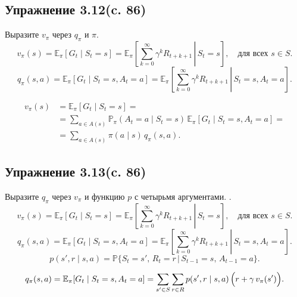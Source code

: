 \subsection{Упражнение 3.12(c. 86)}
Выразите $v_\pi$ через $q_\pi$ и $\pi$.
\[
    v_{\pi}(s)
    =
    \mathbb{E}_{\pi}\!\left[ G_t \mid S_t = s \right]
    =
    \mathbb{E}_{\pi}\!\left[ \left. \sum_{k=0}^{\infty} \gamma^k R_{t+k+1} \,\right|\, S_t = s \right],
    \quad \text{для всех } s \in S.
\]
\[
    q_{\pi}(s,a)
    =
    \mathbb{E}_{\pi}\!\left[ G_t \mid S_t = s, A_t = a \right]
    =
    \mathbb{E}_{\pi}\!\left[ \left. \sum_{k=0}^{\infty} \gamma^k R_{t+k+1}
    \,\right|\, S_t = s, A_t = a \right].
\]
\begin{solution}
    \begin{align*}
    v_\pi(s)
    &= \mathbb{E}_\pi\!\left[ G_t \mid S_t = s \right] =\\
    &= \sum_{a\in A(s)} \mathbb{P}_\pi(A_t=a \mid S_t=s)\,
       \mathbb{E}_\pi\!\left[ G_t \mid S_t=s, A_t=a \right] =\\
    &= \sum_{a\in A(s)} \pi(a\mid s)\, q_\pi(s,a).
    \end{align*}
\end{solution}

\subsection{Упражнение 3.13(c. 86)}
Выразите $q_\pi$ через $v_\pi$ и функцию $p$ с четырьмя аргументами. .
\[
    v_{\pi}(s)
    =
    \mathbb{E}_{\pi}\!\left[ G_t \mid S_t = s \right]
    =
    \mathbb{E}_{\pi}\!\left[ \left. \sum_{k=0}^{\infty} \gamma^k R_{t+k+1} \,\right|\, S_t = s \right],
    \quad \text{для всех } s \in S.
\]
\[
    q_{\pi}(s,a)
    =
    \mathbb{E}_{\pi}\!\left[ G_t \mid S_t = s, A_t = a \right]
    =
    \mathbb{E}_{\pi}\!\left[ \left. \sum_{k=0}^{\infty} \gamma^k R_{t+k+1}
    \,\right|\, S_t = s, A_t = a \right].
\]
\[
p(s', r \mid s, a)
=
\mathbb{P}\!\bigl\{ S_t = s',\, R_t = r \,\big|\, S_{t-1} = s,\, A_{t-1} = a \bigr\}.
\]
\begin{solution}
    \[
    q_\pi(s,a)
    = \mathbb{E}_\pi\!\left[ G_t \mid S_t=s, A_t=a \right]
    = \sum_{s'\in S}\sum_{r\in R} p(s',r\mid s,a)\,\Bigl(r + \gamma\, v_\pi(s')\Bigr).
    \]
\end{solution}

